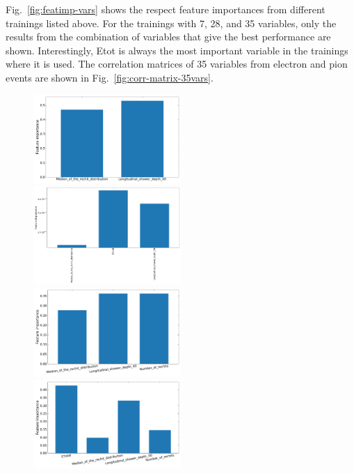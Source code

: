 Fig.~\ref{fig:featimp-vars} shows the respect feature importances from different trainings listed above. For the trainings with 7, 28, and 35 variables, only the results from the combination of variables that give the best performance are shown. Interestingly, Etot is always the most important variable in the trainings where it is used. The correlation matrices of 35 variables from electron and pion events are shown in Fig.~\ref{fig:corr-matrix-35vars}.

\begin{figure}[p]
    \begin{center}  
    \includegraphics[width=0.5\textwidth]{Fig/fig_HGCAL/featimp-2vars-XGBClassifier}~
    \includegraphics[width=0.5\textwidth]{Fig/fig_HGCAL/featimp-3vars-v2-XGBClassifier}\\
    \includegraphics[width=0.5\textwidth]{Fig/fig_HGCAL/featimp-3vars-XGBClassifier}~
    \includegraphics[width=0.5\textwidth]{Fig/fig_HGCAL/featimp-4vars-XGBClassifier}\\

\end{center}
\end{figure}

